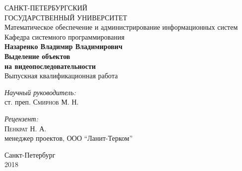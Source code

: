 \documentclass[aps,%
14pt,%
final,%
oneside,
onecolumn,%
musixtex, %
superscriptaddress,%
centertags]{extarticle} %
\begin{document}
\begin{titlepage} 
\begin{center}
{\large САНКТ-ПЕТЕРБУРГСКИЙ \\[3mm] ГОСУДАРСТВЕННЫЙ УНИВЕРСИТЕТ} \\[1.0cm]
{\large Математическое обеспечение и администрирование информационных систем} \\[0.2cm]
{\large Кафедра системного программирования} \\[3.5cm]
 
\textbf{\Large Назаренко Владимир Владимирович} \\[1cm]
\textbf{\LARGE Выделение объектов}\\[4mm]
\textbf{\LARGE на видеопоследовательности}\\[1.0cm]
{\Large Выпускная квалификационная работа} \\[3.5cm]

\begin{flushright} \large
\emph{Научный руководитель:} \\
ст. преп. \textsc{Смирнов М. Н.}
\end{flushright}
 \begin{flushright} \large
\emph{Рецензент:} \\
\textsc{Пенкрат Н. А.} \\
менеджер проектов, ООО ``Ланит-Терком''
\end{flushright}
\vfill 

{\large {Санкт-Петербург}} \\[2mm]
{\large {2018}}
\end{center} 
\end{titlepage}
\end{document}
